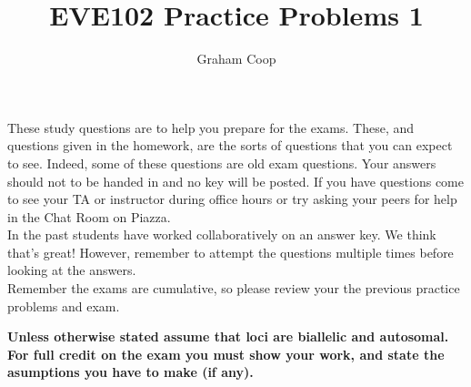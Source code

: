 \documentclass[12pt]{article}
\newcounter{question}[section]   %
\begin{document}
\title{EVE102 Practice Problems 1}
\author{Graham Coop}
\date{}
\maketitle

These study questions are to help you prepare for the exams.
These, and questions given in the homework, are the sorts of questions
that you can expect to see. Indeed, some of these questions are old
exam questions.  Your answers should not to be handed in and no key
will be posted.  If you have questions come to see your TA or
instructor during office hours or try asking your peers for help in
the Chat Room on Piazza.\\
 In the past students have worked
collaboratively on an answer key. We think that's great! However, remember to
attempt the questions multiple times before looking at the answers.\\

Remember the exams are cumulative, so please review your the previous
practice problems and exam.


{\bf Unless otherwise stated assume that loci are biallelic and
autosomal. \\
For full credit on the exam you must show your work, and state the asumptions you have to make
(if any). }\\
\end{document}
